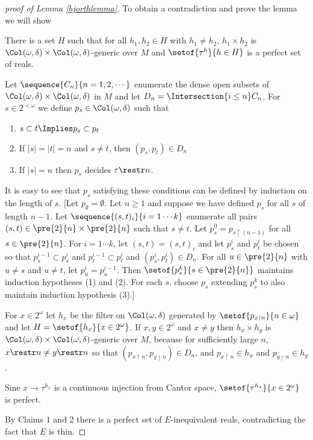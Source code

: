 \documentclass[oneside,12pt]{amsart}
\begin{document}
\begin{proof}[proof of Lemma \ref{hjorthlemma}]
To obtain a contradiction and prove the lemma we will show

\begin{claim}[Claim 2]
There is a set $H$ such that for all $h_1,h_2\in H$ with $h_1\not= h_2$,
$h_1\times h_2$ is $\Col(\omega, \delta)\times \Col(\omega, \delta)$-generic over $M$
and $\setof{\tau^{h}}{h\in H}$ is a perfect set of reals.
\end{claim}
\begin{subproof}
Let $\sequence{C_n}{n=1,2,\cdots}$ enumerate the dense open subsets of $\Col(\omega, \delta)\times \Col(\omega, \delta)$ in $M$
and let $D_n=\Intersection{i\leq n} C_n$.
For $s\in 2^{<\omega}$ we define $p_s\in \Col(\omega, \delta)$ such that
\begin{enumerate}
\item $s\subset t \Implies p_s \subset p_t$
\item If $|s| = |t| = n$ and $s\not=t$, then $(p_s,p_t) \in D_n$
\item If $|s| = n$ then $p_s$ decides $\tau\restr n$.
\end{enumerate}
It is easy to see that $p_s$ satisfying these conditions can be defined by induction on the length of $s$.
[Let $p_{\emptyset} = \emptyset$. Let $n\geq 1$ and suppose we have defined $p_s$ for all $s$ of length $n-1$.
Let $\sequence{(s,t)_i}{i=1\cdots k}$ enumerate all pairs $(s,t)\in{\pre{2}{n}\times \pre{2}{n}}$ such that $s\not=t$.
Let $p^0_s = p_{s\upharpoonright (n-1)}$ for all $s\in \pre{2}{n}$. For $i=1\cdots k$, let $(s,t)=(s,t)_i$ and let $p^i_s$ and $p^i_t$ be
chosen so that $p^{i-1}_s\subset p^i_s$ and $p^{i-1}_t\subset p^i_t$ and $(p^i_s,p^i_t)\in D_{n}$. For all $u\in \pre{2}{n}$ with
$u\not=s$ and $u\not=t$, let $p^i_u=p^{i-1}_u$.
Then $\setof{p^k_s}{s\in\pre{2}{n}}$ maintains induction hypotheses (1) and (2). For each $s$, choose $p_s$ extending $p^k_s$ to also
maintain induction hypothesis (3).]

For $x\in 2^{\omega}$ let $h_x$ be the filter on $\Col(\omega, \delta)$ generated by $\setof{p_{x\upharpoonright n}}{n\in\omega}$
and let $H=\setof{h_x}{x\in 2^{\omega}}$. If $x,y\in 2^{\omega}$ and $x\not=y$ then $h_x\times h_y$ is
$\Col(\omega, \delta)\times \Col(\omega, \delta)$-generic over $M$, because for sufficiently large $n$,
$x\restr n \not= y\restr n$ so that $(p_{x\upharpoonright n },p_{y\upharpoonright n })\in D_n$, and $p_{x\upharpoonright n }\in h_x$ and
$p_{y\upharpoonright n }\in h_y$.

Sine $x\to \tau^{h_x}$ is a continuous injection from Cantor space, $\setof{\tau^{h_x}}{x\in 2^{\omega}}$ is perfect.
\end{subproof}

By Claims 1 and 2 there is a perfect set of $E$-inequivalent reals, contradicting the fact that $E$ is thin.

\end{proof}
\end{document}
